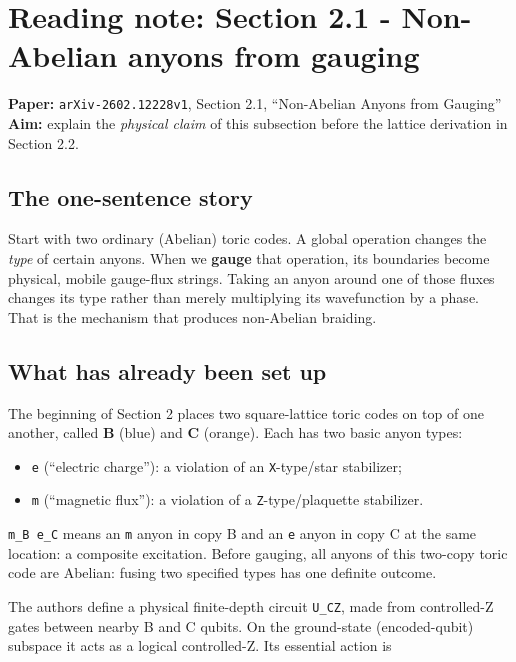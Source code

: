 \documentclass[
]{article}
\author{}
\date{}
\providecommand{\tightlist}{%
  \setlength{\itemsep}{0pt}\setlength{\parskip}{0pt}}
\begin{document}
{
\setcounter{tocdepth}{3}
\tableofcontents
}
\section{Reading note: Section 2.1 - Non-Abelian anyons from
gauging}\label{reading-note-section-2.1---non-abelian-anyons-from-gauging}

\textbf{Paper:} \texttt{arXiv-2602.12228v1}, Section 2.1, ``Non-Abelian
Anyons from Gauging''\\
\textbf{Aim:} explain the \emph{physical claim} of this subsection
before the lattice derivation in Section 2.2.

\subsection{The one-sentence story}\label{the-one-sentence-story}

Start with two ordinary (Abelian) toric codes. A global operation
changes the \emph{type} of certain anyons. When we \textbf{gauge} that
operation, its boundaries become physical, mobile gauge-flux strings.
Taking an anyon around one of those fluxes changes its type rather than
merely multiplying its wavefunction by a phase. That is the mechanism
that produces non-Abelian braiding.

\subsection{What has already been set
up}\label{what-has-already-been-set-up}

The beginning of Section 2 places two square-lattice toric codes on top
of one another, called \textbf{B} (blue) and \textbf{C} (orange). Each
has two basic anyon types:

\begin{itemize}
\tightlist
\item
  \texttt{e} (``electric charge''): a violation of an
  \texttt{X}-type/star stabilizer;
\item
  \texttt{m} (``magnetic flux''): a violation of a
  \texttt{Z}-type/plaquette stabilizer.
\end{itemize}

\texttt{m\_B\ e\_C} means an \texttt{m} anyon in copy B and an
\texttt{e} anyon in copy C at the same location: a composite excitation.
Before gauging, all anyons of this two-copy toric code are Abelian:
fusing two specified types has one definite outcome.

The authors define a physical finite-depth circuit \texttt{U\_CZ}, made
from controlled-Z gates between nearby B and C qubits. On the
ground-state (encoded-qubit) subspace it acts as a logical controlled-Z.
Its essential action is
\end{document}
